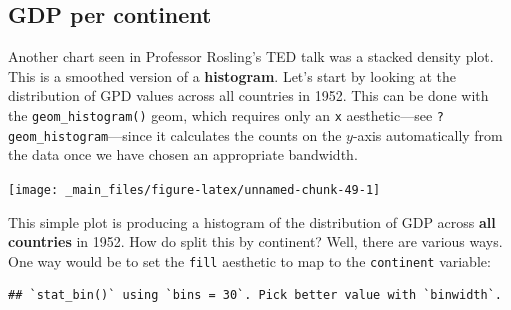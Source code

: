 \documentclass[]{book}
\newenvironment{Shaded}{\begin{snugshade}}{\end{snugshade}}
\newcommand{\KeywordTok}[1]{\textcolor[rgb]{0.13,0.29,0.53}{\textbf{{#1}}}}
\newcommand{\DataTypeTok}[1]{\textcolor[rgb]{0.13,0.29,0.53}{{#1}}}
\newcommand{\DecValTok}[1]{\textcolor[rgb]{0.00,0.00,0.81}{{#1}}}
\newcommand{\StringTok}[1]{\textcolor[rgb]{0.31,0.60,0.02}{{#1}}}
\newcommand{\NormalTok}[1]{{#1}}
\theoremstyle{definition}
\theoremstyle{definition}
\theoremstyle{definition}
\theoremstyle{remark}
\begin{document}
\subsection{GDP per continent}\label{gdp-per-continent}

Another chart seen in Professor Rosling's TED talk was a stacked density
plot. This is a smoothed version of a \textbf{histogram}. Let's start by
looking at the distribution of GPD values across all countries in 1952.
This can be done with the \texttt{geom\_histogram()} geom, which
requires only an \texttt{x} aesthetic---see
\texttt{?geom\_histogram}---since it calculates the counts on the
\(y\)-axis automatically from the data once we have chosen an
appropriate bandwidth.

\begin{Shaded}
\end{Shaded}

\begin{center}\texttt{[image: \_main\_files/figure-latex/unnamed-chunk-49-1]} \end{center}

This simple plot is producing a histogram of the distribution of GDP
across \textbf{all countries} in 1952. How do split this by continent?
Well, there are various ways. One way would be to set the \texttt{fill}
aesthetic to map to the \texttt{continent} variable:

\begin{Shaded}
\end{Shaded}

\begin{verbatim}
## `stat_bin()` using `bins = 30`. Pick better value with `binwidth`.
\end{verbatim}
\end{document}
